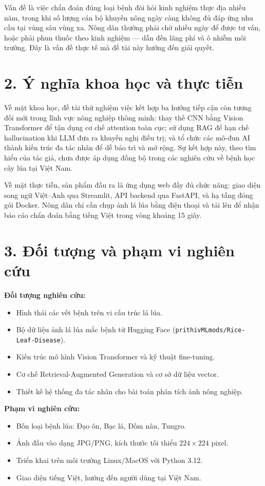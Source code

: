 \documentclass[13pt,a4paper]{extreport}
\begin{document}
Vấn đề là việc chẩn đoán đúng loại bệnh đòi hỏi kinh nghiệm thực địa nhiều năm, trong khi số lượng cán bộ khuyến nông ngày càng không đủ đáp ứng nhu cầu tại vùng sâu vùng xa. Nông dân thường phải chờ nhiều ngày để được tư vấn, hoặc phải phun thuốc theo kinh nghiệm --- dẫn đến lãng phí và ô nhiễm môi trường. Đây là vấn đề thực tế mà đề tài này hướng đến giải quyết.

\section*{2. Ý nghĩa khoa học và thực tiễn}

Về mặt khoa học, đề tài thử nghiệm việc kết hợp ba hướng tiếp cận còn tương đối mới trong lĩnh vực nông nghiệp thông minh: thay thế CNN bằng Vision Transformer để tận dụng cơ chế attention toàn cục; sử dụng RAG để hạn chế hallucination khi LLM đưa ra khuyến nghị điều trị; và tổ chức các mô-đun AI thành kiến trúc đa tác nhân để dễ bảo trì và mở rộng. Sự kết hợp này, theo tìm hiểu của tác giả, chưa được áp dụng đồng bộ trong các nghiên cứu về bệnh học cây lúa tại Việt Nam.

Về mặt thực tiễn, sản phẩm đầu ra là ứng dụng web đầy đủ chức năng: giao diện song ngữ Việt--Anh qua Streamlit, API backend qua FastAPI, và hạ tầng đóng gói Docker. Nông dân chỉ cần chụp ảnh lá lúa bằng điện thoại và tải lên để nhận báo cáo chẩn đoán bằng tiếng Việt trong vòng khoảng 15 giây.

\section*{3. Đối tượng và phạm vi nghiên cứu}

\noindent \textbf{Đối tượng nghiên cứu:}
\begin{itemize}[leftmargin=1.5cm]
    \item Hình thái các vết bệnh trên vi cấu trúc lá lúa.
    \item Bộ dữ liệu ảnh lá lúa mắc bệnh từ Hugging Face (\texttt{prithivMLmods/Rice-Leaf-Disease}).
    \item Kiến trúc mô hình Vision Transformer và kỹ thuật fine-tuning.
    \item Cơ chế Retrieval-Augmented Generation và cơ sở dữ liệu vector.
    \item Thiết kế hệ thống đa tác nhân cho bài toán phân tích ảnh nông nghiệp.
\end{itemize}

\noindent \textbf{Phạm vi nghiên cứu:}
\begin{itemize}[leftmargin=1.5cm]
    \item Bốn loại bệnh lúa: Đạo ôn, Bạc lá, Đốm nâu, Tungro.
    \item Ảnh đầu vào dạng JPG/PNG, kích thước tối thiểu $224 \times 224$ pixel.
    \item Triển khai trên môi trường Linux/MacOS với Python 3.12.
    \item Giao diện tiếng Việt, hướng đến người dùng tại Việt Nam.
\end{itemize}
\end{document}
